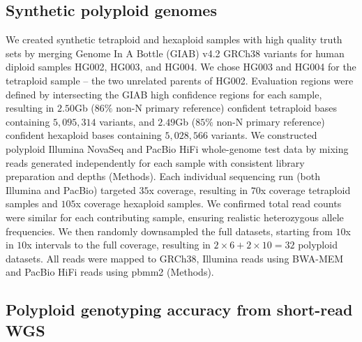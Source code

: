\documentclass[notitlepage, twocolumn, 10pt]{article}
\begin{document}
\subsection*{Synthetic polyploid genomes} We created synthetic tetraploid and hexaploid samples with high quality truth sets by merging Genome In A Bottle \cite{RN651} (GIAB) v4.2 GRCh38 variants for human diploid samples HG002, HG003, and HG004. We chose HG003 and HG004 for the tetraploid sample -- the two unrelated parents of HG002. Evaluation regions were defined by intersecting \cite{RN757} the GIAB high confidence regions for each sample, resulting in $2.50$Gb ($86\%$ non-N primary reference) confident tetraploid bases containing $5,095,314$ variants, and $2.49$Gb ($85\%$ non-N primary reference) confident hexaploid bases containing $5,028,566$ variants. We constructed polyploid Illumina NovaSeq and PacBio HiFi whole-genome test data by mixing reads generated independently for each sample with consistent library preparation and depths (Methods). Each individual sequencing run (both Illumina and PacBio) targeted $35$x coverage, resulting in $70$x coverage tetraploid samples and $105$x coverage hexaploid samples. We confirmed total read counts were similar for each contributing sample, ensuring realistic heterozygous allele frequencies. We then randomly downsampled the full datasets, starting from $10$x in $10$x intervals to the full coverage, resulting in $2 \times 6 + 2 \times 10 = 32$ polyploid datasets. All reads were mapped to GRCh38, Illumina reads using BWA-MEM \cite{RN539} and PacBio HiFi reads using pbmm2 (Methods).

\subsection*{Polyploid genotyping accuracy from short-read WGS}
\end{document}
